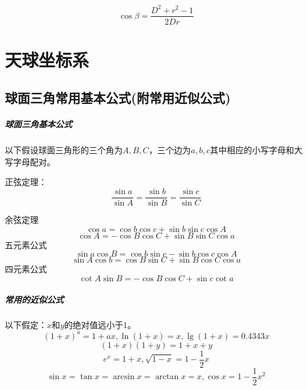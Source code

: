 \begin{equation}
	\cos \beta =\frac{D^2+r^2-1}{2Dr}
\end{equation}


\chapter{天球坐标系}
\section{球面三角常用基本公式(附常用近似公式)}
\paragraph{球面三角基本公式}
以下假设球面三角形的三个角为$A,B,C$，三个边为$a,b,c$其中相应的小写字母和大写字母配对。

\noindent 正弦定理：
\begin{equation}
	\frac{\sin a}{\sin A}=\frac{\sin b}{\sin B}=\frac{\sin c}{\sin C}
\end{equation}

\noindent 余弦定理
\begin{equation}
	\cos a=\cos b \cos c+\sin b \sin c \cos A
\end{equation}
\begin{equation}
	\cos A =-\cos B \cos C+\sin B \sin C \cos a 
\end{equation}
五元素公式
\begin{equation}
	\sin a \cos B =\cos b\sin c-\sin b \cos c \cos A 
\end{equation}
\begin{equation}
	\sin A \cos b =\cos B \sin C+\sin B \cos C \cos a
\end{equation}
四元素公式
\begin{equation}
	\cot A \sin B =- \cos B \cos C+\sin c \cot a 
\end{equation}



\paragraph{常用的近似公式}以下假定：$x$和$y$的绝对值远小于1。
\begin{equation}
	(1+x)^a=1+ax,\ln(1+x)=x,\lg(1+x)=0.4343x
\end{equation}
\begin{equation}
	(1+x)(1+y)=1+x+y
\end{equation}
\begin{equation}
	e^x=1+x,\sqrt{1-x}=1-\frac{1}{2}x
\end{equation}
\begin{equation}
	\sin x =\tan x=\arcsin x= \arctan x =x,\cos x=1-\frac{1}{2}x^2
\end{equation}
